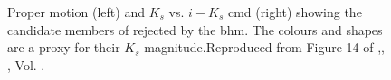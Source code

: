 \begin{figure}[htbp]
\begin{center}
\caption{Proper motion (left) and $K_s$ vs. $i-K_s$ \gls{cmd} (right) showing the candidate members of \citet{Bouy2015} rejected by the \gls{bhm}. The colours and shapes are a proxy for their $K_s$ magnitude.Reproduced from Figure 14 of \citet{Olivares2017},\textit{}, , Vol. .}
\label{fig:rejectedsCOLORS}
\end{center}
\end{figure}

